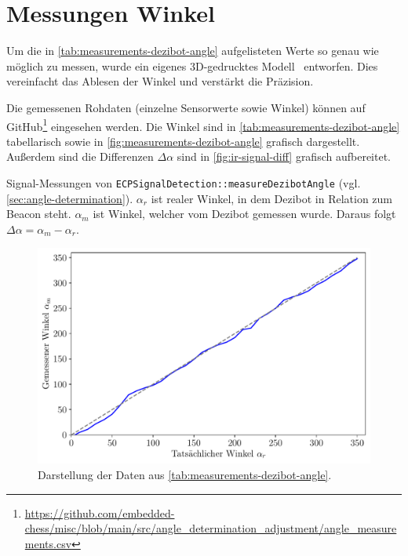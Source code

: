
\section{Messungen Winkel}
\label{sec:measurements-dezibot-angle}

Um die in \autoref{tab:measurements-dezibot-angle} aufgelisteten Werte so genau wie möglich zu messen, wurde ein eigenes 3D\hyphen gedrucktes Modell~\cite{felttipDezibotAlignmentPointer2025} entworfen. Dies vereinfacht das Ablesen der Winkel und verstärkt die Präzision.

Die gemessenen Rohdaten (einzelne Sensorwerte sowie Winkel) können auf GitHub\footnote{\url{https://github.com/embedded-chess/misc/blob/main/src/angle_determination_adjustment/angle_measurements.csv}} eingesehen werden. Die Winkel sind in \autoref{tab:measurements-dezibot-angle} tabellarisch sowie in \autoref{fig:measurements-dezibot-angle} grafisch dargestellt. Außerdem sind die Differenzen $\Delta\alpha$ sind in \autoref{fig:ir-signal-diff} grafisch aufbereitet.

\begin{table}[h!]
    \centering
    
    \caption{Signal-Messungen von \texttt{ECP\-Signal\-Detection::measure\-Dezibot\-Angle} (vgl. \autoref{sec:angle-determination}). $\alpha_r$ ist realer Winkel, in dem Dezibot in Relation zum Beacon steht. $\alpha_m$ ist Winkel, welcher vom Dezibot gemessen wurde. Daraus folgt $\Delta\alpha=\alpha_m - \alpha_r$.}
    \label{tab:measurements-dezibot-angle}
\end{table}

\begin{figure}[h]
    \centering
    \includegraphics[width=\textwidth]{../plot/ir_signal_comparison.pdf}
    \caption{Darstellung der Daten aus \autoref{tab:measurements-dezibot-angle}.}
    \label{fig:measurements-dezibot-angle}
\end{figure}


